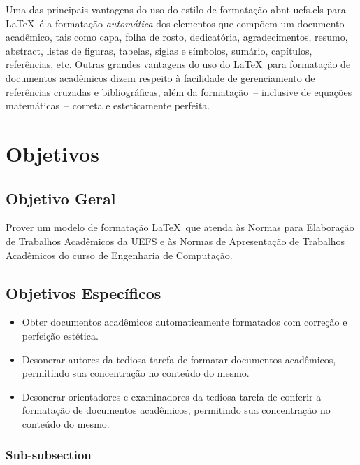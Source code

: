 Uma das principais vantagens do uso do estilo de formata\c{c}\~ao {\ttfamily abnt-uefs.cls} para \LaTeX\ \'e a formata\c{c}\~ao \textit{autom\'atica} dos elementos que comp\~oem um documento acad\^emico, tais como capa, folha de rosto, dedicat\'oria, agradecimentos, resumo, abstract, listas de figuras, tabelas, siglas e s\'imbolos, sum\'ario, cap\'itulos, refer\^encias, etc. Outras grandes vantagens do uso do \LaTeX\ para formata\c{c}\~ao de documentos acad\^emicos dizem respeito \`a facilidade de gerenciamento de refer\^encias cruzadas e bibliogr\'aficas, al\'em da formata\c{c}\~ao~-- inclusive de equa\c{c}\~oes  matem\'aticas~-- correta e esteticamente perfeita.

\section{Objetivos}

\subsection{Objetivo Geral}

Prover um modelo de formata\c{c}\~ao \LaTeX\ que atenda \`as Normas para Elabora\c{c}\~ao de Trabalhos Acad\^emicos da UEFS e \`as Normas de Apresenta\c{c}\~ao de Trabalhos Acad\^emicos do curso de Engenharia de Computa\c{c}\~ao.

\subsection{Objetivos Espec\'ificos}

\begin{itemize}
	\item Obter documentos acad\^emicos automaticamente formatados com corre\c{c}\~ao e perfei\c{c}\~ao est\'etica.
	\item Desonerar autores da tediosa tarefa de formatar documentos acad\^emicos, permitindo sua concentra\c{c}\~ao no conte\'udo do mesmo.
	\item Desonerar orientadores e examinadores da tediosa tarefa de conferir a formata\c{c}\~ao de documentos acad\^emicos, permitindo sua concentra\c{c}\~ao no conte\'udo do mesmo.
\end{itemize}

\subsubsection{Sub-subsection}
